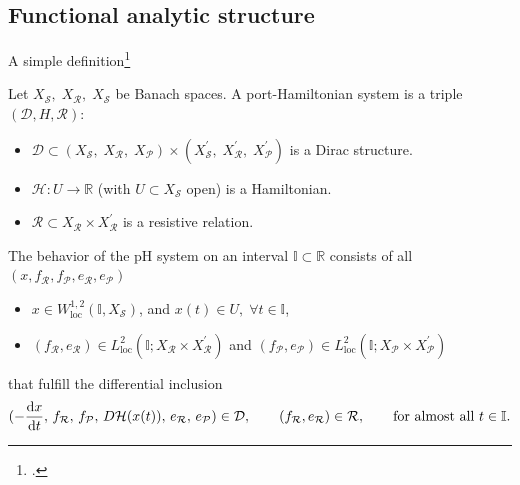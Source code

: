 \documentclass[aspectratio=169]{beamer}
\newcommand{\bbR}{\mathbb{R}}
\newcommand{\bbI}{\mathbb{I}}
\begin{document}
\subsection{Functional analytic structure}

\begin{frame}{A simple definition\footcite{reis2021pH}}
	\begin{definition}
		Let $X_\mathcal{S}, \; X_\mathcal{R}, \; {X}_{\mathcal{S}}$ be Banach spaces. A port-Hamiltonian system is a triple $(\mathcal{D}, H, \mathcal{R})$:
		\begin{itemize}
			\item $\mathcal{D} \subset (X_\mathcal{S}, \; X_\mathcal{R}, \; X_\mathcal{P}) \times (X^{'}_\mathcal{S}, \; X^{'}_\mathcal{R}, \; X^{'}_\mathcal{P})$ is a Dirac structure.
			\item $\mathcal{H} : U \rightarrow \bbR$ (with $U \subset X_\mathcal{S}$ open) is a Hamiltonian.
			\item $\mathcal{R}\subset X_\mathcal{R} \times X_{\mathcal{R}}^{'}$ is a resistive relation.
		\end{itemize}
		The behavior of the pH system on an interval $\mathbb{I} \subset \bbR$ consists of all $(x, f_{\mathcal{R}}, f_{\mathcal{P}} , e_{\mathcal{R}}, e_{\mathcal{P}})$
		\begin{itemize}
			\item 	$x \in W^{1,2}_{\text{loc}}(\mathbb{I}, X_{\mathcal{S}})$, and $x(t) \in U, \; \forall t \in \bbI$, 
			\item $(f_\mathcal{R}, e_\mathcal{R}) \in L^2_{\text{loc}}(\bbI; X_{\mathcal{R}} \times X^{'}_{\mathcal{R}})$ and $(f_\mathcal{P}, e_\mathcal{P}) \in L^2_{\text{loc}}(\bbI; X_{\mathcal{P}} \times X^{'}_{\mathcal{P}})$
		\end{itemize}
		that fulfill the differential inclusion
		\begin{equation*}
			(-\diff{x}{t},\, f_{\mathcal{R}},\, f_{\mathcal{P}},\, D\mathcal{H}(x(t)),\, e_{\mathcal{R}},\, e_{\mathcal{P}}) \in \mathcal{D}, \qquad (f_\mathcal{R}, e_\mathcal{R}) \in \mathcal{R}, \qquad \text{for almost all } t \in \bbI.
		\end{equation*}
	\end{definition}
\end{frame}
\end{document}
